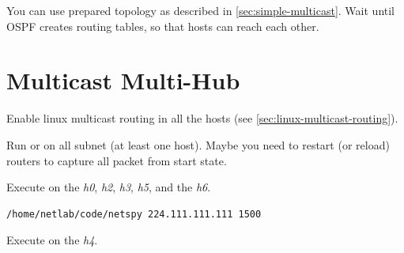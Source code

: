 \documentclass{../UTNetLab}
\begin{document}
You can use prepared topology as described in \autoref{sec:simple-multicast}.
Wait until OSPF creates routing tables, so that hosts can reach each other.



\section{Multicast Multi-Hub}\label{sec:multi-hub}

Enable linux multicast routing in all the hosts (see \autoref{sec:linux-multicast-routing}).

Run  or  on all subnet (at least one host).
Maybe you need to restart (or reload) routers to capture all packet from start state.

Execute  on the \textit{h0}, \textit{h2}, \textit{h3}, \textit{h5}, and the \textit{h6}.

\begin{lstlisting}
/home/netlab/code/netspy 224.111.111.111 1500
\end{lstlisting}

Execute  on the \textit{h4}.
\end{document}
